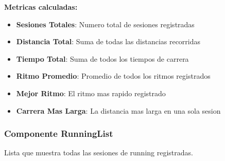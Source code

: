 \documentclass[12pt,a4paper]{article}
\begin{document}
\textbf{Metricas calculadas:}
\begin{itemize}
    \item \textbf{Sesiones Totales}: Numero total de sesiones registradas
    \item \textbf{Distancia Total}: Suma de todas las distancias recorridas
    \item \textbf{Tiempo Total}: Suma de todos los tiempos de carrera
    \item \textbf{Ritmo Promedio}: Promedio de todos los ritmos registrados
    \item \textbf{Mejor Ritmo}: El ritmo mas rapido registrado
    \item \textbf{Carrera Mas Larga}: La distancia mas larga en una sola sesion
\end{itemize}

\subsubsection{Componente RunningList}

Lista que muestra todas las sesiones de running registradas.
\end{document}
